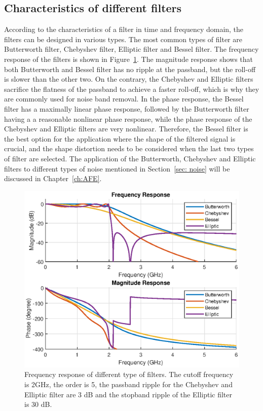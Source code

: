 \subsection{Characteristics of different filters}
According to the characteristics of a filter in time and frequency domain, the filters can be designed in various types. The most common types of filter are Butterworth filter, Chebyshev filter, Elliptic filter and Bessel filter. The frequency response of the filters is shown in Figure~\ref{fig:Filter_freqResponse_diffType}. The magnitude response shows that both Butterworth and Bessel filter has no ripple at the passband, but the roll-off is slower than the other two. On the contrary, the Chebyshev and Elliptic filters sacrifice the flatness of the passband to achieve a faster roll-off, which is why they are commonly used for noise band removal. In the phase response, the Bessel filter has a maximally linear phase response, followed by the Butterworth filter having a a reasonable nonlinear phase response, while the phase response of the Chebyshev and Elliptic filters are very nonlinear. Therefore, the Bessel filter is the best option for the application where the shape of the filtered signal is crucial, and the shape distortion needs to be considered when the last two types of filter are selected. The application of the Butterworth, Chebyshev and Elliptic filters to different types of noise mentioned in Section~\ref{sec: noise} will be discussed in Chapter~\ref{ch:AFE}. 
\begin{figure}[t!p]
\centering
\includegraphics[width=.8\textwidth]{figures/chapter_background/Filter_FreqResp_diffFilters.eps}
\caption{Frequency response of different type of filters. The cutoff frequency is 2GHz, the order is 5, the passband ripple for the Chebyshev and Elliptic filter are 3 dB and the stopband ripple of the Elliptic filter is 30 dB.}
\label{fig:Filter_freqResponse_diffType}
\end{figure}
